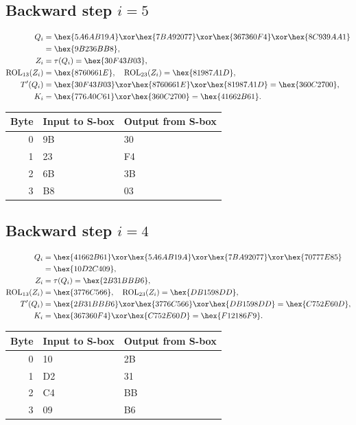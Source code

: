 \subsection*{Backward step $i=5$}
\begin{align*}
Q_i&=\hex{5A6AB19A}\xor\hex{7BA92077}\xor\hex{367360F4}\xor\hex{8C939AA1}\\&=\hex{9B236BB8},\\
Z_i&=\tau(Q_i)=\hex{30F43B03},\\
\operatorname{ROL}_{13}(Z_i)&=\hex{8760661E},\quad\operatorname{ROL}_{23}(Z_i)=\hex{81987A1D},\\
T'(Q_i)&=\hex{30F43B03}\xor\hex{8760661E}\xor\hex{81987A1D}=\hex{360C2700},\\
K_i&=\hex{776A0C61}\xor\hex{360C2700}=\hex{41662B61}.\end{align*}
\begingroup\small
\begin{longtable}{rll}
\toprule
Byte & Input to S-box & Output from S-box\\\midrule
\endhead
0 & 9B & 30\\
1 & 23 & F4\\
2 & 6B & 3B\\
3 & B8 & 03\\
\bottomrule\end{longtable}
\endgroup
\subsection*{Backward step $i=4$}
\begin{align*}
Q_i&=\hex{41662B61}\xor\hex{5A6AB19A}\xor\hex{7BA92077}\xor\hex{70777E85}\\&=\hex{10D2C409},\\
Z_i&=\tau(Q_i)=\hex{2B31BBB6},\\
\operatorname{ROL}_{13}(Z_i)&=\hex{3776C566},\quad\operatorname{ROL}_{23}(Z_i)=\hex{DB1598DD},\\
T'(Q_i)&=\hex{2B31BBB6}\xor\hex{3776C566}\xor\hex{DB1598DD}=\hex{C752E60D},\\
K_i&=\hex{367360F4}\xor\hex{C752E60D}=\hex{F12186F9}.\end{align*}
\begingroup\small
\begin{longtable}{rll}
\toprule
Byte & Input to S-box & Output from S-box\\\midrule
\endhead
0 & 10 & 2B\\
1 & D2 & 31\\
2 & C4 & BB\\
3 & 09 & B6\\
\bottomrule\end{longtable}
\endgroup
